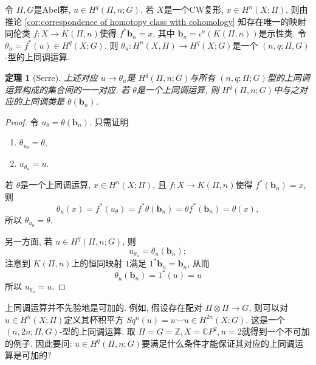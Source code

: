 \documentclass{ctexart}
\theoremstyle{plain}
\newtheorem{theorem}{定理}[section]
\theoremstyle{definition}
\begin{document}
        令 $\Pi, G$是Abel群, $u\in H^{q}(\Pi,n;G)$. 若 $X$是一个CW复形, $x \in H^{n}(X;\Pi)$, 则由推论 \ref{cor:correspondence of homotopy class with cohomology} 知存在唯一的映射同伦类 $f:X\to K(\Pi, n)$使得 $f^{*}\mathbf{b}_{n}=x$, 其中 $\mathbf{b}_{n}=\iota^{n}(K(\Pi, n))$是示性类. 令 $\theta_{u}=f^{*}(u)\in H^{q}(X; G)$. 则 $\theta_{u}:H^{n}(X,\Pi)\to H^{q}(X;G)$是一个 $(n,q;\Pi,G)$-型的上同调运算.

        \begin{theorem}[Serre]
            上述对应 $u\to \theta_{u}$是 $H^{q}(\Pi,n;G)$与所有 $(n,q;\Pi;G)$型的上同调运算构成的集合间的一一对应. 若 $\theta$是一个上同调运算, 则 $H^{q}(\Pi,n;G)$中与之对应的上同调类是 $\theta(\mathbf{b}_{n})$.
        \end{theorem}

        \begin{proof}
            令 $u_{\theta}=\theta(\mathbf{b}_{n})$. 只需证明
            \begin{enumerate}
                \item $\theta_{u_{\theta}}=\theta$,
                \item $u_{\theta_{u}}=u$.
            \end{enumerate}

            若 $\theta$是一个上同调运算, $x \in H^{n}(X;\Pi)$, 且 $f:X\to K(\Pi,n)$使得 $f^{*}(\mathbf{b}_{n})=x$, 则 
            \begin{equation*}
              \theta_{u}(x)=f^{*}(u_{\theta})=f^{*}\theta(\mathbf{b}_{n})=\theta f^{*}(\mathbf{b}_{n})=\theta(x),
            \end{equation*}
            所以 $\theta_{u_{\theta}}=\theta$.

            另一方面, 若 $u \in H^{q}(\Pi,n;G)$, 则 
            \begin{equation*}
              u_{\theta_{u}}=\theta_{u}(\mathbf{b}_{n});
            \end{equation*}
            注意到 $K(\Pi,n)$上的恒同映射 $1$满足 $1^{*}\mathbf{b}_{n}=\mathbf{b}_{n}$, 从而 
            \begin{equation*}
              \theta_{u}(\mathbf{b}_{n})=1^{*}(u)=u
            \end{equation*}
            所以 $u_{\theta_{u}}=u$.
        \end{proof}

        上同调运算并不先验地是可加的. 例如, 假设存在配对 $\Pi \otimes \Pi\to G$, 则可以对 $u \in H^{n}(X; \Pi)$定义其杯积平方 $Sq^{n}(u)=u \smile u \in H^{2n}(X;G)$. 这是一个 $(n,2n;\Pi,G)$-型的上同调运算. 取 $\Pi=G=\mathbb{Z}, X=\mathbb{C}P^{2}, n=2$就得到一个不可加的例子. 因此要问: $u \in H^{q}(\Pi,n;G)$要满足什么条件才能保证其对应的上同调运算是可加的?
\end{document}
